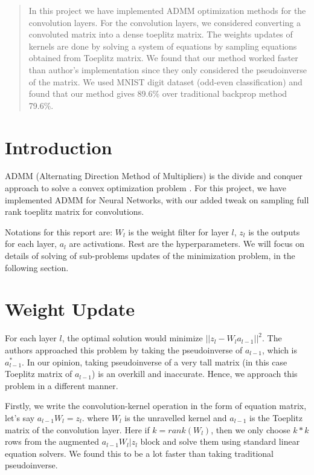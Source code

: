 \documentclass[12pt]{article}
\begin{document}
\maketitle

\begin{abstract}
In this project we have implemented ADMM optimization methods for the convolution layers.
For the convolution layers, we considered converting a convoluted matrix into a dense toeplitz matrix.
The weights updates of kernels are done by solving a system of equations by sampling equations obtained from Toeplitz matrix.
We found that our method worked faster than author's implementation since they only considered the pseudoinverse of the matrix.
We used MNIST digit dataset (odd-even classification) and found that our method gives 89.6\% over traditional backprop method 79.6\%.
\end{abstract}

\section{Introduction}
ADMM (Alternating Direction Method of Multipliers) is the divide and conquer approach to solve a convex optimization problem \cite{taylor2016training}.
For this project, we have implemented ADMM for Neural Networks, with our added tweak on sampling full rank toeplitz matrix for convolutions.

Notations for this report are: $W_l$ is the weight filter for layer $l$, $z_l$ is the outputs for each layer, $a_l$ are activations.
Rest are the hyperparameters.
We will focus on details of solving of sub-problems updates of the minimization problem, in the following section.

\section{Weight Update}

For each layer $l$, the optimal solution would minimize $||z_l - W_l a_{l-1} ||^2$.
The authors approached this problem by taking the pseudoinverse of $a_{l-1}$, which is $a_{l-1}^*$.
In our opinion, taking pseudoinverse of a very tall matrix (in this case Toeplitz matrix \cite{gray2006toeplitz} of $a_{l-1}$) is an overkill and inaccurate.
Hence, we approach this problem in a different manner.

Firstly, we write the convolution-kernel operation in the form of equation matrix, let's say $a_{l-1}W_l  = z_l$.
where $W_l$ is the unravelled kernel and $a_{l-1}$ is the Toeplitz matrix of the convolution layer.
Here if $k = rank(W_l)$, then we only choose $k*k$ rows from the augmented $a_{l-1}W_l | z_l$ block and solve them using standard linear equation solvers.
We found this to be a lot faster than taking traditional pseudoinverse.
\end{document}
